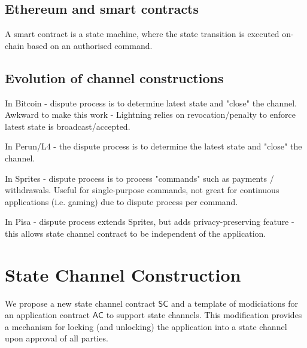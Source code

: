 \documentclass{llncs}
\newcommand{\statechannel}{\mathsf{SC}}
\newcommand{\appcontract}{\mathsf{AC}}
\begin{document}
\subsection{Ethereum and smart contracts}


A smart contract is a state machine, where the state transition is executed on-chain based on an authorised command. 


\subsection{Evolution of channel constructions}

In Bitcoin - dispute process is to determine latest state and "close" the channel. Awkward to make this work - Lightning relies on revocation/penalty to enforce latest state is broadcast/accepted. 

In Perun/L4 - the dispute process is to determine the latest state and "close" the channel. 

In Sprites - dispute process is to process "commands" such as payments / withdrawals. Useful for single-purpose commands, not great for continuous applications (i.e. gaming) due to dispute process per command.

In Pisa - dispute process extends Sprites, but adds privacy-preserving feature - this allows state channel contract to be independent of the application. 

\section{State Channel Construction} 

We propose a new state channel contract $\statechannel$ and a template of modiciations for an application contract $\appcontract$  to support state channels. 
This modification provides a mechanism for locking (and unlocking) the application into a state channel upon approval of all parties. 
\end{document}
